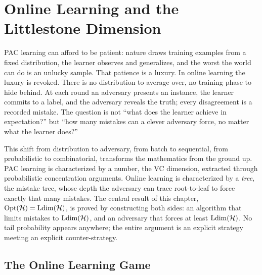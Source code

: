 
\chapter{Online Learning and the Littlestone Dimension}
\label{ch:online}

PAC learning can afford to be patient: nature draws training examples from a fixed distribution, the learner observes and generalizes, and the worst the world can do is an unlucky sample. That patience is a luxury. In online learning the luxury is revoked. There is no distribution to average over, no training phase to hide behind. At each round an adversary presents an instance, the learner commits to a label, and the adversary reveals the truth; every disagreement is a recorded mistake. The question is not ``what does the learner achieve in expectation?'' but ``how many mistakes can a clever adversary force, no matter what the learner does?''

This shift from distribution to adversary, from batch to sequential, from probabilistic to combinatorial, transforms the mathematics from the ground up. PAC learning is characterized by a number, the VC dimension, extracted through probabilistic concentration arguments. Online learning is characterized by a \emph{tree}, the mistake tree, whose depth the adversary can trace root-to-leaf to force exactly that many mistakes. The central result of this chapter, $\mathrm{Opt}(\mathcal{H}) = \mathrm{Ldim}(\mathcal{H})$, is proved by constructing both sides: an algorithm that limits mistakes to $\mathrm{Ldim}(\mathcal{H})$, and an adversary that forces at least $\mathrm{Ldim}(\mathcal{H})$. No tail probability appears anywhere; the entire argument is an explicit strategy meeting an explicit counter-strategy.


\section{The Online Learning Game}
\label{sec:online-game}

